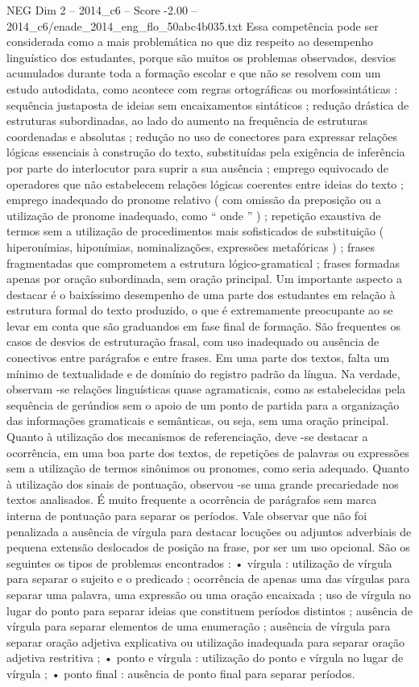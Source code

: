 \begin{textsample}{NEG Dim 2 – 2014\_c6 – Score -2.00 – 2014\_c6/enade\_2014\_eng\_flo\_50abc4b035.txt}
Essa competência pode ser considerada como a mais problemática no que diz respeito ao desempenho linguístico dos estudantes, porque são muitos os problemas observados, desvios acumulados durante toda a formação escolar e que não se resolvem com um estudo autodidata, como acontece com regras ortográficas ou morfossintáticas : sequência justaposta de ideias sem encaixamentos sintáticos ; redução drástica de estruturas subordinadas, ao lado do aumento na frequência de estruturas coordenadas e absolutas ; redução no uso de conectores para expressar relações lógicas essenciais à construção do texto, substituídas pela exigência de inferência por parte do interlocutor para suprir a sua ausência ; emprego equivocado de operadores que não estabelecem relações lógicas coerentes entre ideias do texto ; emprego inadequado do pronome relativo ( com omissão da preposição ou a utilização de pronome inadequado, como “ onde ” ) ; repetição exaustiva de termos sem a utilização de procedimentos mais sofisticados de substituição ( hiperonímias, hiponímias, nominalizações, expressões metafóricas ) ; frases fragmentadas que comprometem a estrutura lógico-gramatical ; frases formadas apenas por oração subordinada, sem oração principal.
Um importante aspecto a destacar é o baixíssimo desempenho de uma parte dos estudantes em relação à estrutura formal do texto produzido, o que é extremamente preocupante ao se levar em conta que são graduandos em fase final de formação.
São frequentes os casos de desvios de estruturação frasal, com uso inadequado ou ausência de conectivos entre parágrafos e entre frases.
Em uma parte dos textos, falta um mínimo de textualidade e de domínio do registro padrão da língua.
Na verdade, observam -se relações linguísticas quase agramaticais, como as estabelecidas pela sequência de gerúndios sem o apoio de um ponto de partida para a organização das informações gramaticais e semânticas, ou seja, sem uma oração principal.
Quanto à utilização dos mecanismos de referenciação, deve -se destacar a ocorrência, em uma boa parte dos textos, de repetições de palavras ou expressões sem a utilização de termos sinônimos ou pronomes, como seria adequado.
Quanto à utilização dos sinais de pontuação, observou -se uma grande precariedade nos textos analisados.
É muito frequente a ocorrência de parágrafos sem marca interna de pontuação para separar os períodos.
Vale observar que não foi penalizada a ausência de vírgula para destacar locuções ou adjuntos adverbiais de pequena extensão deslocados de posição na frase, por ser um uso opcional.
São os seguintes os tipos de problemas encontrados : • vírgula : utilização de vírgula para separar o sujeito e o predicado ; ocorrência de apenas uma das vírgulas para separar uma palavra, uma expressão ou uma oração encaixada ; uso de vírgula no lugar do ponto para separar ideias que constituem períodos distintos ; ausência de vírgula para separar elementos de uma enumeração ; ausência de vírgula para separar oração adjetiva explicativa ou utilização inadequada para separar oração adjetiva restritiva ; • ponto e vírgula : utilização do ponto e vírgula no lugar de vírgula ; • ponto final : ausência de ponto final para separar períodos.

\end{textsample}
